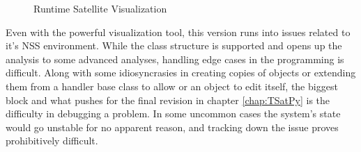 \begin{figure}[ht]
  \centerline{}
  \caption{Runtime Satellite Visualization}
  \label{fig:RuntimeSatelliteVisualization}
\end{figure}

Even with the powerful visualization tool, this version runs into issues related to it's NSS environment.  While the class structure is supported and opens up the analysis to some advanced analyses, handling edge cases in the programming is difficult.  Along with some idiosyncrasies in creating copies of objects or extending them from a handler base class to allow or an object to edit itself, the biggest block and what pushes for the final revision in chapter \ref{chap:TSatPy} is the difficulty in debugging a problem.  In some uncommon cases the system's state would go unstable for no apparent reason, and tracking down the issue proves prohibitively difficult.
